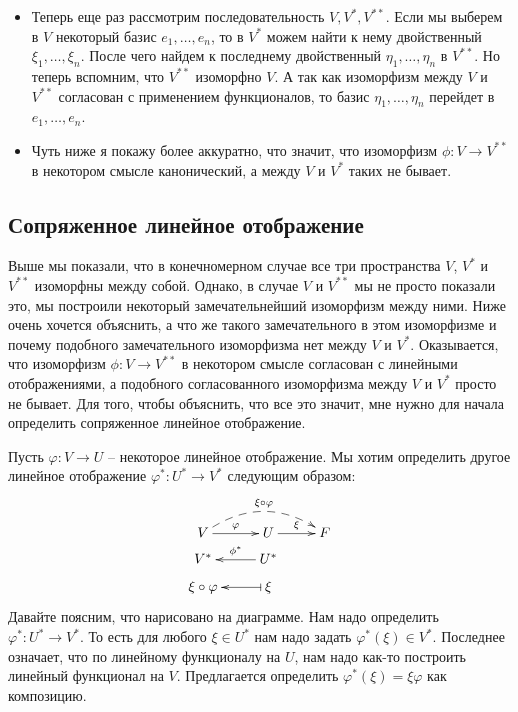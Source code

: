 \begin{itemize}
\item Теперь еще раз рассмотрим последовательность $V, V^*, V^{**}$. Если мы выберем в $V$ некоторый базис $e_1,\ldots,e_n$, то в $V^*$ можем найти к нему двойственный $\xi_1,\ldots,\xi_n$. После чего найдем к последнему двойственный $\eta_1,\ldots,\eta_n$ в $V^{**}$. Но теперь вспомним, что $V^{**}$ изоморфно $V$. А так как изоморфизм между $V$ и $V^{**}$ согласован с применением функционалов, то базис $\eta_1,\ldots,\eta_n$ перейдет в $e_1,\ldots,e_n$.

\item Чуть ниже я покажу более аккуратно, что значит, что изоморфизм $\phi\colon V\to V^{**}$ в некотором смысле канонический, а между $V$ и $V^*$ таких не бывает.
\end{itemize}


\subsection{Сопряженное линейное отображение}

Выше мы показали, что в конечномерном случае все три пространства $V$, $V^*$ и $V^{**}$ изоморфны между собой. Однако, в случае $V$ и $V^{**}$ мы не просто показали это, мы построили некоторый замечательнейший изоморфизм между ними. Ниже очень хочется объяснить, а что же такого замечательного в этом изоморфизме и почему подобного замечательного изоморфизма нет между $V$ и $V^*$. Оказывается, что изоморфизм $\phi\colon V \to V^{**}$ в некотором смысле согласован с линейными отображениями, а подобного согласованного изоморфизма между $V$ и $V^*$ просто не бывает. Для того, чтобы объяснить, что все это значит, мне нужно для начала определить сопряженное линейное отображение.

Пусть $\varphi\colon V\to U$ -- некоторое линейное отображение. Мы хотим определить другое линейное отображение $\varphi^* \colon U^*\to V^*$ следующим образом:
\[
\xymatrix@R=6pt{
	{V}\ar[r]^{\varphi}\ar@{-->}@/^16pt/[rr]^{\xi\circ \varphi}&{U}\ar[r]^{\xi}&{F}\\
	{V^*}&{U^*}\ar[l]_{\phi^*}&{}\\
	{\xi\circ \varphi}&{\xi}\ar@{|->}[l]&{}\\
}
\]
Давайте поясним, что нарисовано на диаграмме. Нам надо определить $\varphi^*\colon U^*\to V^*$. То есть для любого $\xi\in U^*$ нам надо задать $\varphi^*(\xi)\in V^*$. Последнее означает, что по линейному функционалу на $U$, нам надо как-то построить линейный функционал на $V$. Предлагается определить $\varphi^*(\xi) = \xi \varphi$ как композицию.

